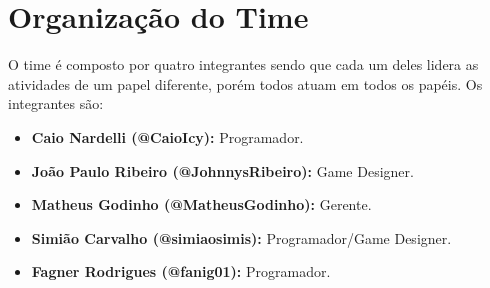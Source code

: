 \section{Organização do Time}

O time é composto por quatro integrantes sendo que cada um deles lidera as atividades de um papel diferente, porém todos atuam em todos os papéis. Os integrantes são:

\begin{itemize}
\item\textbf{Caio Nardelli (@CaioIcy):} Programador. 
\item\textbf{João Paulo Ribeiro (@JohnnysRibeiro):} Game Designer.
\item\textbf{Matheus Godinho (@MatheusGodinho):} Gerente.
\item\textbf{Simião Carvalho (@simiaosimis):} Programador/Game Designer.
\item\textbf{Fagner Rodrigues (@fanig01):} Programador.
\end{itemize}
